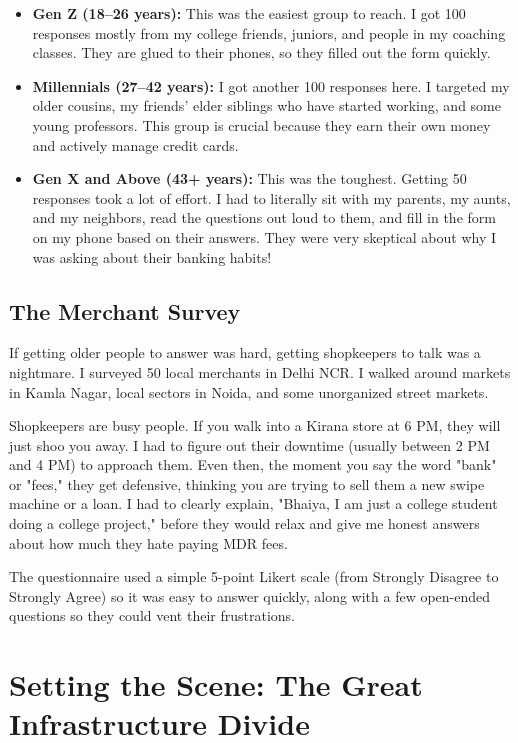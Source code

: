 \begin{itemize}
    \item \textbf{Gen Z (18--26 years):} This was the easiest group to reach. I got 100 responses mostly from my college friends, juniors, and people in my coaching classes. They are glued to their phones, so they filled out the form quickly.
    \item \textbf{Millennials (27--42 years):} I got another 100 responses here. I targeted my older cousins, my friends' elder siblings who have started working, and some young professors. This group is crucial because they earn their own money and actively manage credit cards.
    \item \textbf{Gen X and Above (43+ years):} This was the toughest. Getting 50 responses took a lot of effort. I had to literally sit with my parents, my aunts, and my neighbors, read the questions out loud to them, and fill in the form on my phone based on their answers. They were very skeptical about why I was asking about their banking habits!
\end{itemize}

\subsection{The Merchant Survey}
If getting older people to answer was hard, getting shopkeepers to talk was a nightmare. I surveyed 50 local merchants in Delhi NCR. I walked around markets in Kamla Nagar, local sectors in Noida, and some unorganized street markets.

Shopkeepers are busy people. If you walk into a Kirana store at 6 PM, they will just shoo you away. I had to figure out their downtime (usually between 2 PM and 4 PM) to approach them. Even then, the moment you say the word "bank" or "fees," they get defensive, thinking you are trying to sell them a new swipe machine or a loan. I had to clearly explain, "Bhaiya, I am just a college student doing a college project," before they would relax and give me honest answers about how much they hate paying MDR fees.

The questionnaire used a simple 5-point Likert scale (from Strongly Disagree to Strongly Agree) so it was easy to answer quickly, along with a few open-ended questions so they could vent their frustrations.

\section{Setting the Scene: The Great Infrastructure Divide}


